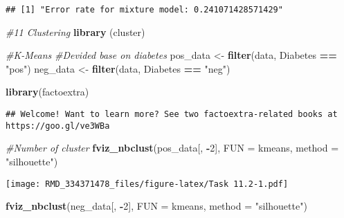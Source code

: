 \documentclass[
]{article}
\newenvironment{Shaded}{\begin{snugshade}}{\end{snugshade}}
\newcommand{\AttributeTok}[1]{\textcolor[rgb]{0.13,0.29,0.53}{#1}}
\newcommand{\CommentTok}[1]{\textcolor[rgb]{0.56,0.35,0.01}{\textit{#1}}}
\newcommand{\DecValTok}[1]{\textcolor[rgb]{0.00,0.00,0.81}{#1}}
\newcommand{\FunctionTok}[1]{\textcolor[rgb]{0.13,0.29,0.53}{\textbf{#1}}}
\newcommand{\NormalTok}[1]{#1}
\newcommand{\OtherTok}[1]{\textcolor[rgb]{0.56,0.35,0.01}{#1}}
\newcommand{\SpecialCharTok}[1]{\textcolor[rgb]{0.81,0.36,0.00}{\textbf{#1}}}
\newcommand{\StringTok}[1]{\textcolor[rgb]{0.31,0.60,0.02}{#1}}
\begin{document}
\begin{verbatim}
## [1] "Error rate for mixture model: 0.241071428571429"
\end{verbatim}

\begin{Shaded}
\begin{Highlighting}[]
\CommentTok{\#11 Clustering}
\FunctionTok{library}\NormalTok{ (cluster)}

\CommentTok{\#K{-}Means}
\CommentTok{\#Devided base on diabetes}
\NormalTok{pos\_data }\OtherTok{\textless{}{-}} \FunctionTok{filter}\NormalTok{(data, Diabetes }\SpecialCharTok{==} \StringTok{"pos"}\NormalTok{)}
\NormalTok{neg\_data }\OtherTok{\textless{}{-}} \FunctionTok{filter}\NormalTok{(data, Diabetes }\SpecialCharTok{==} \StringTok{"neg"}\NormalTok{)}
\end{Highlighting}
\end{Shaded}

\begin{Shaded}
\begin{Highlighting}[]
\FunctionTok{library}\NormalTok{(factoextra)}
\end{Highlighting}
\end{Shaded}

\begin{verbatim}
## Welcome! Want to learn more? See two factoextra-related books at https://goo.gl/ve3WBa
\end{verbatim}

\begin{Shaded}
\begin{Highlighting}[]
\CommentTok{\#Number of cluster}
\FunctionTok{fviz\_nbclust}\NormalTok{(pos\_data[, }\SpecialCharTok{{-}}\DecValTok{2}\NormalTok{], }\AttributeTok{FUN =}\NormalTok{ kmeans, }\AttributeTok{method =} \StringTok{"silhouette"}\NormalTok{)}
\end{Highlighting}
\end{Shaded}

\texttt{[image: RMD\_334371478\_files/figure-latex/Task 11.2-1.pdf]}

\begin{Shaded}
\begin{Highlighting}[]
\FunctionTok{fviz\_nbclust}\NormalTok{(neg\_data[, }\SpecialCharTok{{-}}\DecValTok{2}\NormalTok{], }\AttributeTok{FUN =}\NormalTok{ kmeans, }\AttributeTok{method =} \StringTok{"silhouette"}\NormalTok{)}
\end{Highlighting}
\end{Shaded}
\end{document}
